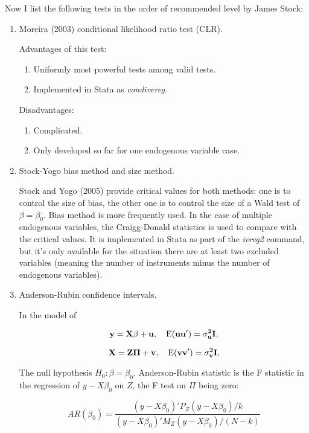 Now I list the following tests in the order of recommended level by
James Stock:

\begin{enumerate}

\item Moreira (2003) conditional likelihood ratio test (CLR).


  Advantages of this test: \begin{enumerate}
\item Uniformly most powerful tests among valid tests.  \item
  Implemented in Stata as {\em condivereg}.  \end{enumerate}

Disadvantages: 
 \begin{enumerate}
\item Complicated.  \item  Only developed so far for one endogenous
  variable case.  \end{enumerate}

\item Stock-Yogo bias method and size method.  

Stock and Yogo (2005) provide critical values for both methods: one is
to control the size of bias, the other one is to control the size of a
Wald test of $\beta=\beta_0$.  Bias method is more frequently used.
In the case of multiple endogenous variables, the Craigg-Donald
statistics is used to compare with the critical values.  It is
implemented in Stata as part of the {\em ivreg2} command, but it's
only available for the situation there are at least two excluded
variables (meaning the number of instruments minus the number of
endogenous variables).  

\item  Anderson-Rubin confidence intervals.  

In the model of 

\begin{equation}
\bf y=X\beta+u, \quad {\rm E} (u u')=\sigma_u^2 I,
\end{equation}

\begin{equation}
\bf X=Z\Pi+v, \quad {\rm E} (v v')=\sigma_v^2 I,
\end{equation}

The null hypothesis $H_0: \beta=\beta_0$.  Anderson-Rubin statistic
is the F statistic in the regression of $y-X \beta_0$ on $Z$, the F
test on $\Pi$ being zero:


\begin{equation}
AR(\beta_0)= \frac{(y-X\beta_0)' P_Z (y-X\beta_0)/k}{(y-X\beta_0)' M_Z
  (y-X\beta_0)/(N-k)}
\end{equation}


\end{enumerate}
